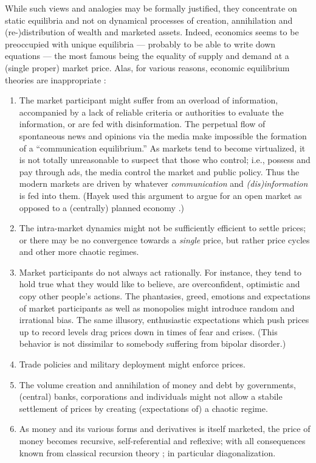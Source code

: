 \documentclass[aps,rmp,preprint,amsfonts,showpacs,showkeys]{revtex4}
\begin{document}
While such views and analogies may be formally justified, they concentrate on static equilibria and not on
dynamical processes of creation, annihilation and (re-)distribution of wealth and marketed assets.
Indeed, economics seems to be preoccupied with unique equilibria --- probably to be able to write down equations --- the most famous being the equality of supply and demand at a (single proper) market price.
Alas, for various reasons, economic equilibrium theories are inappropriate \cite{soros-alchemy,2006-Binswanger}:
\renewcommand{\labelenumi}{(\roman{enumi})}
\begin{enumerate}

\item
The market participant might suffer from an overload of information,
accompanied by a lack of reliable criteria or authorities to evaluate the information, or are fed with disinformation.
The perpetual flow of spontaneous news and opinions via the media make impossible the formation of a ``communication equilibrium.''
As markets tend to become virtualized, it is not totally unreasonable to suspect
that those who control; i.e., possess and pay through ads, the media control the market and public policy.
Thus the modern markets are driven by whatever {\em communication} and {\em (dis)information} is fed into them.
(Hayek used this argument to argue for an open market as opposed to a (centrally) planned economy \cite{Hayek-45}.)

\item
The intra-market dynamics might not be sufficiently efficient to settle prices; or there may be no convergence towards a {\em single} price,
but rather price cycles and other more chaotic regimes.

\item
Market participants do not always act rationally.
For instance, they tend to hold true what they would like to believe, are overconfident, optimistic and copy other people's actions.
The phantasies,  greed, emotions and expectations of market participants as well as
monopolies might introduce random and irrational bias.
The same illusory, enthusiastic expectations which push prices up to record levels
drag prices down in times of fear and crises.
(This behavior is not dissimilar to somebody suffering from bipolar disorder.)

\item
Trade policies and military deployment might enforce prices.

\item
The volume creation and annihilation of money and debt by governments, (central) banks,
corporations and individuals might not allow a stabile settlement of prices by creating (expectations of) a chaotic regime.

\item
As money and its various forms and derivatives
is itself marketed, the price of money becomes recursive, self-referential and reflexive; with all consequences known from
classical recursion theory \cite{rogers1,odi:89}; in particular diagonalization.
\end{enumerate}
\end{document}
